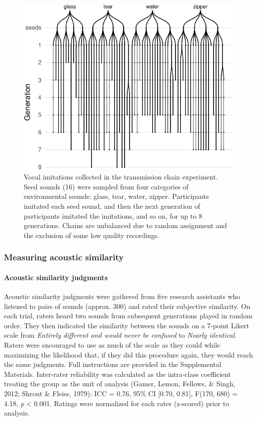 \documentclass[english,floatsintext,man]{apa6}
\theoremstyle{definition}
\theoremstyle{definition}
\theoremstyle{remark}
\begin{document}
\begin{figure}
\centering
\includegraphics{fig1-1.pdf}
\caption{\label{fig:fig1}Vocal imitations collected in the transmission
chain experiment. Seed sounds (16) were sampled from four categories of
environmental sounds: glass, tear, water, zipper. Participants imitated
each seed sound, and then the next generation of participants imitated
the imitations, and so on, for up to 8 generations. Chains are
unbalanced due to random assignment and the exclusion of some low
quality recordings.}
\end{figure}

\subsubsection{Measuring acoustic
similarity}\label{measuring-acoustic-similarity}

\paragraph{Acoustic similarity
judgments}\label{acoustic-similarity-judgments}

Acoustic similarity judgments were gathered from five research
assistants who listened to pairs of sounds (approx. 300) and rated their
subjective similarity. On each trial, raters heard two sounds from
subsequent generations played in random order. They then indicated the
similarity between the sounds on a 7-point Likert scale from
\emph{Entirely different and would never be confused} to \emph{Nearly
identical}. Raters were encouraged to use as much of the scale as they
could while maximizing the likelihood that, if they did this procedure
again, they would reach the same judgments. Full instructions are
provided in the Supplemental Materials. Inter-rater reliability was
calculated as the intra-class coefficient treating the group as the unit
of analysis (Gamer, Lemon, Fellows, \& Singh, 2012; Shrout \& Fleiss,
1979): ICC = 0.76, 95\% CI {[}0.70, 0.81{]}, F(170, 680) = 4.18,
\emph{p} \textless{} 0.001. Ratings were normalized for each rater
(z-scored) prior to analysis.
\end{document}
